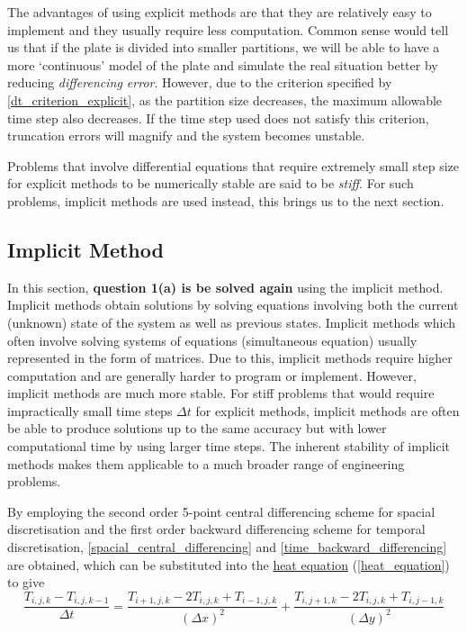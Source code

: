 \documentclass[a4paper]{article}
\begin{document}
		The advantages of using explicit methods are that they are relatively easy to implement and they usually require less computation. Common sense would tell us that if the plate is divided into smaller partitions, we will be able to have a more `continuous' model of the plate and simulate the real situation better by reducing \textit{differencing error}. However, due to the criterion specified by \autoref{dt_criterion_explicit}, as the partition size decreases, the maximum allowable time step also decreases. If the time step used does not satisfy this criterion, truncation errors will magnify and the system becomes unstable.
		
		Problems that involve differential equations that require extremely small step size for explicit methods to be numerically stable are said to be \emph{stiff}. For such problems, implicit methods are used instead, this brings us to the next section.
		
	\subsection{Implicit Method}
		In this section, \textbf{question 1(a) is be solved again} using the implicit method. Implicit methods obtain solutions by solving equations involving both the current (unknown) state of the system as well as previous states. Implicit methods which often involve solving systems of equations (simultaneous equation) usually represented in the form of matrices. Due to this, implicit methods require higher computation and are generally harder to program or implement. However, implicit methods are much more stable. For stiff problems that would require impractically small time steps $\Delta t$ for explicit methods, implicit methods are often be able to produce solutions up to the same accuracy but with lower computational time by using larger time steps. The inherent stability of implicit methods makes them applicable to a much broader range of engineering problems.
	
		By employing the second order 5-point central differencing scheme for spacial discretisation and the first order backward differencing scheme for temporal discretisation, \autoref{spacial_central_differencing} and \autoref{time_backward_differencing} are obtained, which can be substituted into the \hyperref[heat_equation]{heat equation} (\autoref{heat_equation}) to give
		\begin{equation}
			\frac{T_{i,j,k} - T_{i,j,k-1}}{\Delta t}
			=
			\frac{T_{i+1,j,k} - 2T_{i,j,k} + T_{i-1,j,k}}{(\Delta x)^2}
			+ 
			\frac{T_{i,j+1,k} - 2T_{i,j,k} + T_{i,j-1,k}}{(\Delta y)^2}
			\label{heat_equation_differencing}
		\end{equation}
		
\end{document}
